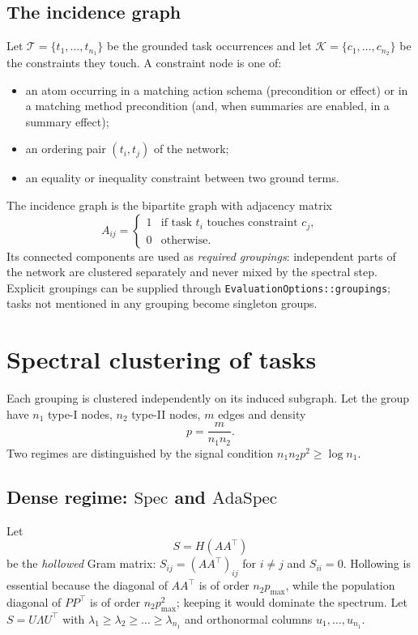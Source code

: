 \documentclass[11pt,a4paper]{article}
\newcommand{\cK}{\mathcal{K}}
\newcommand{\cT}{\mathcal{T}}
\begin{document}
\subsection{The incidence graph}
Let $\cT=\{t_1,\dots,t_{n_1}\}$ be the grounded task occurrences and let
$\cK=\{c_1,\dots,c_{n_2}\}$ be the constraints they touch. A constraint node is
one of:
\begin{itemize}[leftmargin=1.6em,itemsep=1pt]
\item an atom occurring in a matching action schema (precondition or effect) or
      in a matching method precondition (and, when summaries are enabled, in a
      summary effect);
\item an ordering pair $(t_i,t_j)$ of the network;
\item an equality or inequality constraint between two ground terms.
\end{itemize}
The incidence graph is the bipartite graph with adjacency matrix
\begin{equation}
A_{ij}=
\begin{cases}
1 & \text{if task }t_i\text{ touches constraint }c_j,\\
0 & \text{otherwise}.
\end{cases}
\end{equation}
Its connected components are used as \emph{required groupings}: independent
parts of the network are clustered separately and never mixed by the spectral
step. Explicit groupings can be supplied through
\texttt{EvaluationOptions::groupings}; tasks not mentioned in any grouping
become singleton groups.

\section{Spectral clustering of tasks}
\label{sec:clustering}

Each grouping is clustered independently on its induced subgraph. Let the
group have $n_1$ type-I nodes, $n_2$ type-II nodes, $m$ edges and density
\begin{equation}
p=\frac{m}{n_1n_2}.
\end{equation}
Two regimes are distinguished by the signal condition
$n_1n_2p^2\ge\log n_1$.

\subsection{Dense regime: \texorpdfstring{$\mathrm{Spec}$}{Spec} and
\texorpdfstring{$\mathrm{AdaSpec}$}{AdaSpec}}
Let
\begin{equation}
S=H(AA^\top)
\end{equation}
be the \emph{hollowed} Gram matrix: $S_{ij}=(AA^\top)_{ij}$ for $i\ne j$ and
$S_{ii}=0$. Hollowing is essential because the diagonal of $AA^\top$ is of
order $n_2p_{\max}$, while the population diagonal of $PP^\top$ is of order
$n_2p_{\max}^2$; keeping it would dominate the spectrum. Let
$S=U\Lambda U^\top$ with
$\lambda_1\ge\lambda_2\ge\dots\ge\lambda_{n_1}$ and orthonormal columns
$u_1,\dots,u_{n_1}$.
\end{document}

